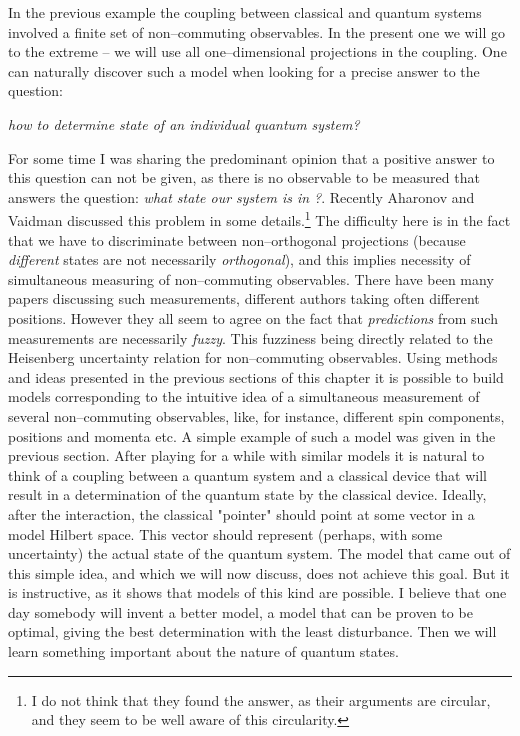 \documentclass[12pt]{article}
\begin{document}
In the previous example the coupling between classical and quantum
systems involved a finite set of non--commuting observables.  In the
present one we will go to the extreme -- we will use { all}
one--dimensional projections in the coupling.  One can naturally discover
such a model when looking for a precise answer to the question: 
\begin{center} {\sl how
to determine state of an individual quantum system?}
\end{center}
For some time I was sharing the predominant opinion
 that a positive answer to this question can
not be given,  as there is no observable to be measured that answers the
question:  {\sl what state our system is in ?}.  Recently Aharonov and
Vaidman
\cite{aha} discussed this problem in some details.\footnote{I do not
think that they found the answer,  as their arguments 
are circular,  and they seem to be well aware of this circularity. } 
The
difficulty here is in the fact that we have to discriminate between
non--orthogonal projections  (because {\sl different} states are not
necessarily {\sl orthogonal}),  and this implies necessity of 
simultaneous measuring
of non--commuting observables.  There have been many papers discussing
such measurements,  different authors taking often different positions.  
However they all seem to agree on  the fact that {\sl
predictions} from such measurements are necessarily {\sl fuzzy}.  
This fuzziness
being directly related to the Heisenberg uncertainty relation for
non--commuting observables.  Using methods and ideas presented 
in the previous 
sections of this chapter it is possible to build
models corresponding to the intuitive idea of a simultaneous
measurement of several non--commuting observables,  like,  for instance, 
 different spin components,  
positions {and}
momenta etc.  A simple example of such a model was given in the 
previous section.  
After playing for a while with similar models it is
natural to think of a coupling between a quantum system and a
classical device that will result in a determination of the quantum state
by the classical device.  Ideally,  after the interaction,  the classical
"pointer" should point at some vector in a model
 Hilbert space.  This vector should
represent  (perhaps,  with some uncertainty) the actual state of the
quantum system.  The model that came out of this simple idea,  and which
we will now discuss,  does not achieve this goal.  But it is instructive, 
as it shows that models of this kind are possible.  I believe that one day
somebody will invent a better model,  a model that can be proven to be
optimal,  giving the best determination with the least disturbance.  Then
we will learn something important about the nature of quantum states. 
\end{document}
